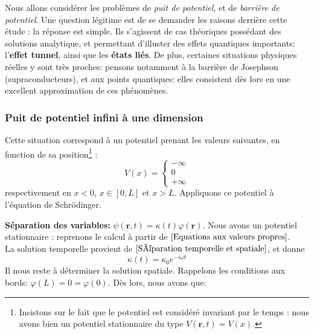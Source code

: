 \documentclass[../notesdecours]{subfiles}
\begin{document}
Nous allons considérer les problèmes de \textit{puit de potentiel}, et de\textit{ barrière de potentiel}. Une question légitime est de se demander les raisons derrière cette étude : la réponse est simple. Ils s'agissent de cas théoriques possédant des solutions analytique, et permettant d'illuster des effets quantiques importants: l'\textbf{effet tunnel}, ainsi que les \textbf{états liés}. De plus, certaines situations physiques réelles y sont très proches: pensons notamment à la barrière de Josephson (supraconducteurs), et aux points quantiques: elles consistent dès lors en une excellent approximation de ces phénomènes.\\

\subsubsection{Puit de potentiel infini à une dimension}

Cette situation correspond à un potentiel prenant les valeurs suivantes, en fonction de sa position\footnote{Insistons sur le fait que le potentiel est considéré invariant par le temps : nous avons bien un potentiel stationnaire du type $V(\bm{r},t) = V(x)$.} : 
\begin{equation}
V(x) = 
\begin{cases}
-\infty\\
0\\
+\infty
\end{cases}
\end{equation}
respectivement en $x < 0$, $x \in [0,L]$ et $x >L$. Appliquons ce potentiel à l'équation de Schrödinger.

\textbf{Séparation des variables:} $\psi(\bm{r},t) = \kappa(t)\varphi(\bm{r})$. Nous avons un potentiel stationnaire : reprenons le calcul à partir de $\eqref{Equations aux valeurs propres}$.\\

La solution temporelle provient de $\eqref{Séparation temporelle et spatiale}$, et donne 
\begin{equation}
\kappa(t) = \kappa_0 e^{-i \omega t}
\end{equation}
Il nous reste à déterminer la solution spatiale. Rappelons les conditions aux bords:  $\varphi(L) = 0 = \varphi(0)$. Dès lors, nous avons que:\\
\end{document}
